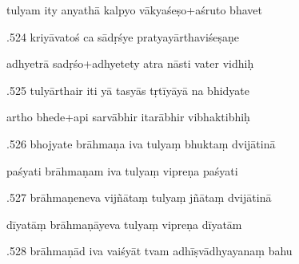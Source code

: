 \documentclass[article,12pt,a4paper]{memoir}%
\newcounter{parCount}
\begin{document}
	  
	  \pstart \leavevmode%
	tulyam ity anyathā kalpyo vākyaśeṣo+aśruto bhavet 
	{}
	\pend%
      

	  
	  \pstart {}.524 kriyāvatoś ca sādṛśye pratyayārthaviśeṣaṇe 
	{}
	\pend%
      

	  
	  \pstart \leavevmode%
	adhyetrā sadṛśo+adhyetety atra nāsti vater vidhiḥ 
	{}
	\pend%
      

	  
	  \pstart {}.525 tulyārthair iti yā tasyās tṛtīyāyā na bhidyate 
	{}
	\pend%
      

	  
	  \pstart \leavevmode%
	artho bhede+api sarvābhir itarābhir vibhaktibhiḥ 
	{}
	\pend%
      

	  
	  \pstart {}.526 bhojyate brāhmaṇa iva tulyaṃ bhuktaṃ dvijātinā 
	{}
	\pend%
      

	  
	  \pstart \leavevmode%
	paśyati brāhmaṇam iva tulyaṃ vipreṇa paśyati 
	{}
	\pend%
      

	  
	  \pstart {}.527 brāhmaṇeneva vijñātaṃ tulyaṃ jñātaṃ dvijātinā 
	{}
	\pend%
      

	  
	  \pstart \leavevmode%
	dīyatāṃ brāhmaṇāyeva tulyaṃ vipreṇa dīyatām 
	{}
	\pend%
      

	  
	  \pstart {}.528 brāhmaṇād iva vaiśyāt tvam   adhīṣvādhyayanaṃ bahu 
	{}
	\pend%
      
\end{document}
